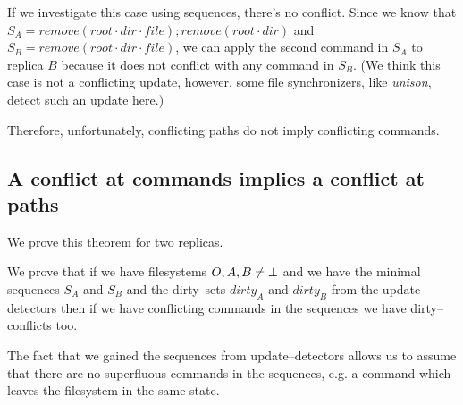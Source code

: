 If we investigate this case using sequences, there's no conflict. Since we
know that 
\(S_A=remove(root\cdot dir\cdot file); remove(root\cdot dir)\) and
\(S_B=remove(root\cdot dir\cdot file)\), we can apply the second
command in \(S_A\) to replica \(B\) because it does not conflict
with any command in \(S_B\). (We think this case is not a conflicting
update, however, some file synchronizers, like \emph{unison}, detect such
an update here.)

Therefore, unfortunately, conflicting paths do not imply 
conflicting commands.

\subsection{A conflict at commands implies a conflict at paths}
\label{subsec:comimplpath}

%
%

We prove this theorem for two replicas.

We prove that if we have filesystems \(O,A,B\neq\bot\) and we have
the minimal sequences \(S_A\) and \(S_B\) and the dirty--sets
\(dirty_A\) and \(dirty_B\) from the update--detectors then if we have
conflicting commands in the sequences we have dirty--conflicts too.

The fact that we gained the sequences from update--detectors allows us to
assume that there are no superfluous commands in the sequences, e.g. a
command which leaves the filesystem in the same state.


